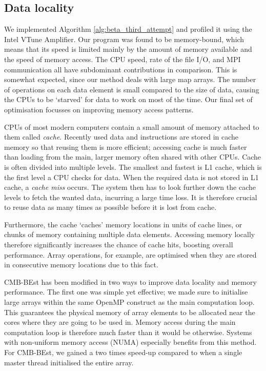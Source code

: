 \subsection{Data locality}

We implemented Algorithm \ref{alg:beta_third_attempt} and profiled it using the Intel VTune Amplifier. Our program was found to be memory-bound, which means that its speed is limited mainly by the amount of memory available and the speed of memory access. The CPU speed, rate of the file I/O, and MPI communication all have subdominant contributions in comparison. This is somewhat expected, since our method deals with large map arrays. The number of operations on each data element is small compared to the size of data, causing the CPUs to be `starved' for data to work on most of the time. Our final set of optimisation focusses on improving memory access patterns.

CPUs of most modern computers contain a small amount of memory attached to them called \textit{cache}. Recently used data and instructions are stored in cache memory so that reusing them is more efficient; accessing cache is much faster than loading from the main, larger memory often shared with other CPUs. Cache is often divided into multiple levels. The smallest and fastest is L1 cache, which is the first level a CPU checks for data. When the required data is not stored in L1 cache, a \textit{cache miss} occurs. The system then has to look further down the cache levels to fetch the wanted data, incurring a large time loss. It is therefore crucial to reuse data as many times as possible before it is lost from cache.

Furthermore, the cache `caches' memory locations in units of cache lines, or chunks of memory containing multiple data elements. Accessing memory locally therefore significantly increases the chance of cache hits, boosting overall performance. Array operations, for example, are optimised when they are stored in consecutive memory locations due to this fact.

CMB-BEst has been modified in two ways to improve data locality and memory performance. The first one was simple yet effective; we made sure to initialise large arrays within the same OpenMP construct as the main computation loop. This guarantees the physical memory of array elements to be allocated near the cores where they are going to be used in. Memory access during the main computation loop is therefore much faster than it would be otherwise. Systems with non-uniform memory access (NUMA) especially benefits from this method. For CMB-BEst, we gained a two times speed-up compared to when a single master thread initialised the entire array.

